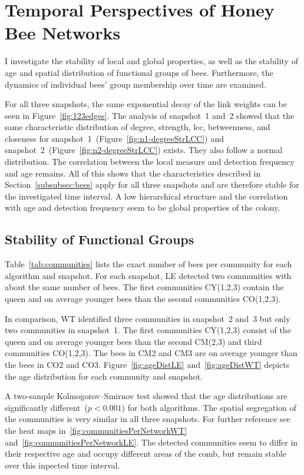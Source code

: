 \section{Temporal Perspectives of Honey Bee Networks}
\label{sec:temporalresults}
I investigate the stability of local and global properties, as well as the stability of age and spatial distribution of functional groups of bees.
Furthermore, the dynamics of individual bees' group membership over time are examined.

For all three snapshots, the same exponential decay of the link weights can be seen in Figure~\ref{fig:123edges}.
The analysis of snapshot~1 and~2 showed that the same characteristic distribution of degree, strength, lcc, betweenness, and closeness for snapshot~1~(Figure~\ref{fig:n1-degreeStrLCC}) and snapshot~2~(Figure~\ref{fig:n2-degreeStrLCC}) exists. They also follow a normal distribution. The correlation between the local measure and detection frequency and age remains.
All of this shows that the characteristics described in Section~\ref{subsubsec:bees} apply for all three snapshots and are therefore stable for the investigated time interval. A low hierarchical structure and the correlation with age and detection frequency seem to be global properties of the colony.

\subsection{Stability of Functional Groups}
Table~\ref{tab:communities} lists the exact number of bees per community for each algorithm and snapshot.
For each snapshot, LE detected two communities with about the same number of bees.
The first communities CY(1,2,3) contain the queen and on average younger bees than the second communities CO(1,2,3).

In comparison, WT identified three communities in snapshot~2 and~3 but only two communities in snapshot~1.
The first communities CY(1,2,3) consist of the queen and on average younger bees than the second CM(2,3) and third communities CO(1,2,3).
The bees in CM2 and CM3 are on average younger than the bees in CO2 and CO3.
Figure~\ref{fig:ageDistLE} and~\ref{fig:ageDistWT} depicts the age distribution for each community and snapshot.

A two-sample Kolmogorov–Smirnov test showed that the age distributions are significantly different~($p< 0.001$) for both algorithms.
The spatial segregation of the communities is very similar in all three snapshots. For further reference see the heat maps in~\ref{fig:communitiesPerNetworkWT} and~\ref{fig:communitiesPerNetworkLE}.
The detected communities seem to differ in their respective age and occupy different areas of the comb, but remain stable over this inpected time interval.

